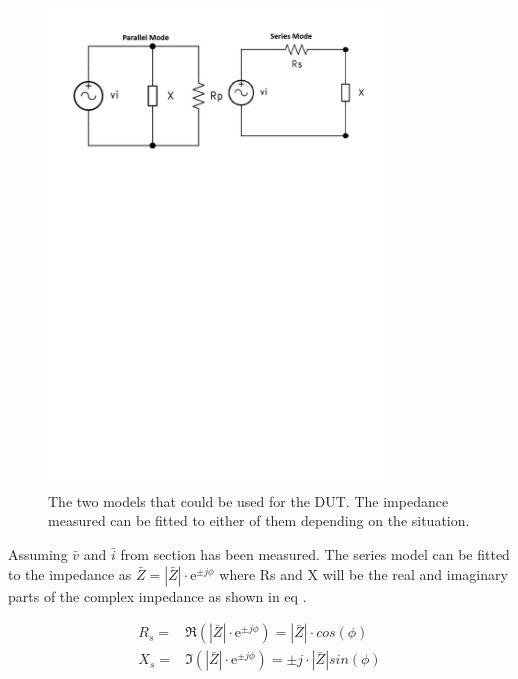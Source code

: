\begin{figure}[H]
    \centering
    \includegraphics[clip, trim=0 550 0 0, width=0.8\textwidth]{Sections/4_TechnicalAnalysis/Figures/4_1_5_SeriesParallelMode.pdf}
    \caption{The two models that could be used for the DUT. The impedance measured can be fitted to either of them depending on the situation.}
    \label{fig:4_1_5_DUTXSeriesParallelMode}
\end{figure}

Assuming $\bar v$ and $\bar i$ from section  has been measured. The series model can be fitted to the impedance as $\bar Z =|\bar Z| \cdot \mathrm e^{\pm j\phi}$ where Rs and X will be the real and imaginary parts of the complex impedance as shown in eq .

\begin{equation}\label{eq:4_1_5_SeriesModel1}
    \begin{split}
        R_s =& \Re(|\bar Z| \cdot \mathrm e^{\pm j\phi}) = |\bar Z| \cdot cos(\phi)\\
        X_s =& \Im(|\bar Z| \cdot \mathrm e^{\pm j\phi}) = \pm j\cdot |\bar Z| sin(\phi) 
    \end{split}
\end{equation}


